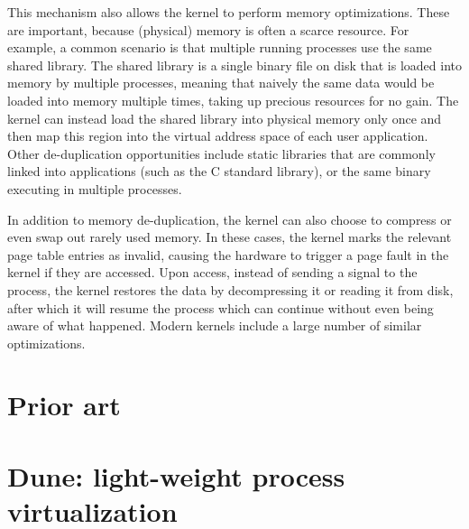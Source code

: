 This mechanism also allows the kernel to perform memory optimizations. These are important, because (physical) memory is often a scarce resource. For example, a common scenario is that multiple running processes use the same shared library. The shared library is a single binary file on disk that is loaded into memory by multiple processes, meaning that naively the same data would be loaded into memory multiple times, taking up precious resources for no gain. The kernel can instead load the shared library into physical memory only once and then map this region into the virtual address space of each user application. Other de-duplication opportunities include static libraries that are commonly linked into applications (such as the C standard library), or the same binary executing in multiple processes.

In addition to memory de-duplication, the kernel can also choose to compress or even swap out rarely used memory. In these cases, the kernel marks the relevant page table entries as invalid, causing the hardware to trigger a page fault in the kernel if they are accessed. Upon access, instead of sending a signal to the process, the kernel restores the data by decompressing it or reading it from disk, after which it will resume the process which can continue without even being aware of what happened. Modern kernels include a large number of similar optimizations. 


\section{Prior art}


\section{Dune: light-weight process virtualization}
\label{sec:bg-dune}

